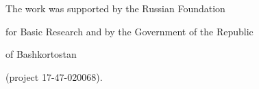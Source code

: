 










\Ack

\noindent

The work was supported by the Russian Foundation

for Basic Research and by the Government of the Republic

of Bashkortostan

(project 17-47-020068).

 





\renewcommand{\bibname}{\protect\rmfamily References}




